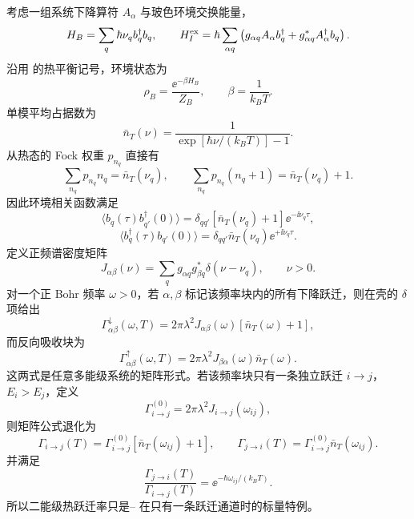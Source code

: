 \begin{exbox}[热玻色环境]
考虑一组系统下降算符 $A_\alpha$ 与玻色环境交换能量，
\begin{equation}
H_B=\sum_q\hbar\nu_qb_q^\dagger b_q,
\qquad
H_I^{\rm ex}
=\hbar\sum_{\alpha q}
\left(
 g_{\alpha q}A_\alpha b_q^\dagger
+g_{\alpha q}^*A_\alpha^\dagger b_q
\right).
\label{eq:phys-oqs-boson-exchange}
\end{equation}
沿用 的热平衡记号，环境状态为
\[
\rho_B=\frac{\ee^{-\beta H_B}}{Z_B},
\qquad
\beta=\frac1{k_BT}.
\]
单模平均占据数为
\begin{equation}
\bar n_T(\nu)=\frac1{\exp[\hbar\nu/(k_BT)]-1}.
\label{eq:phys-oqs-bose-occupation}
\end{equation}
从热态的 Fock 权重 $p_{n_q}$ 直接有
\[
\sum_{n_q}p_{n_q}n_q=\bar n_T(\nu_q),
\qquad
\sum_{n_q}p_{n_q}(n_q+1)=\bar n_T(\nu_q)+1.
\]
因此环境相关函数满足
\[
\langle b_q(\tau)b_{q'}^\dagger(0)\rangle
=\delta_{qq'}[\bar n_T(\nu_q)+1]\ee^{-\ii\nu_q\tau},
\]
\[
\langle b_q^\dagger(\tau)b_{q'}(0)\rangle
=\delta_{qq'}\bar n_T(\nu_q)\ee^{+\ii\nu_q\tau}.
\]
定义正频谱密度矩阵
\begin{equation}
J_{\alpha\beta}(\nu)
=\sum_qg_{\alpha q}g_{\beta q}^*\delta(\nu-\nu_q),
\qquad \nu>0.
\label{eq:phys-oqs-boson-j}
\end{equation}
对一个正 Bohr 频率 $\omega>0$，若 $\alpha,\beta$ 标记该频率块内的所有下降跃迁，则在壳的 $\delta$ 项给出
\begin{equation}
\Gamma_{\alpha\beta}^{\downarrow}(\omega,T)
=2\pi\lambda^2J_{\alpha\beta}(\omega)
[\bar n_T(\omega)+1],
\label{eq:phys-oqs-thermal-down-matrix}
\end{equation}
而反向吸收块为
\begin{equation}
\Gamma_{\alpha\beta}^{\uparrow}(\omega,T)
=2\pi\lambda^2J_{\beta\alpha}(\omega)
\bar n_T(\omega).
\label{eq:phys-oqs-thermal-up-matrix}
\end{equation}
这两式是任意多能级系统的矩阵形式。若该频率块只有一条独立跃迁 $i\to j$，$E_i>E_j$，定义
\[
\Gamma_{i\to j}^{(0)}
=2\pi\lambda^2J_{i\to j}(\omega_{ij}),
\]
则矩阵公式退化为
\begin{equation}
\Gamma_{i\to j}(T)
=\Gamma_{i\to j}^{(0)}[\bar n_T(\omega_{ij})+1],
\qquad
\Gamma_{j\to i}(T)
=\Gamma_{i\to j}^{(0)}\bar n_T(\omega_{ij}).
\label{eq:phys-oqs-thermal-transition-rates}
\end{equation}
并满足
\[
\frac{\Gamma_{j\to i}(T)}{\Gamma_{i\to j}(T)}
=\ee^{-\hbar\omega_{ij}/(k_BT)}.
\]
所以二能级热跃迁率只是-- 在只有一条跃迁通道时的标量特例。
\end{exbox}

